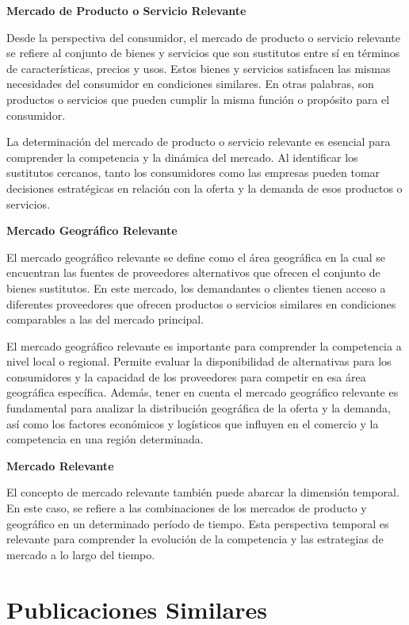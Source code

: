 \documentclass[
  doc,
  floatsintext,
  longtable,
  a4paper,
  nolmodern,
  notxfonts,
  notimes,
  12pt,
  colorlinks=true,linkcolor=blue,citecolor=blue,urlcolor=blue]{apa7}
\begin{document}
\textbf{Mercado de Producto o Servicio Relevante}

Desde la perspectiva del consumidor, el mercado de producto o servicio
relevante se refiere al conjunto de bienes y servicios que son
sustitutos entre sí en términos de características, precios y usos.
Estos bienes y servicios satisfacen las mismas necesidades del
consumidor en condiciones similares. En otras palabras, son productos o
servicios que pueden cumplir la misma función o propósito para el
consumidor.

La determinación del mercado de producto o servicio relevante es
esencial para comprender la competencia y la dinámica del mercado. Al
identificar los sustitutos cercanos, tanto los consumidores como las
empresas pueden tomar decisiones estratégicas en relación con la oferta
y la demanda de esos productos o servicios.

\textbf{Mercado Geográfico Relevante}

El mercado geográfico relevante se define como el área geográfica en la
cual se encuentran las fuentes de proveedores alternativos que ofrecen
el conjunto de bienes sustitutos. En este mercado, los demandantes o
clientes tienen acceso a diferentes proveedores que ofrecen productos o
servicios similares en condiciones comparables a las del mercado
principal.

El mercado geográfico relevante es importante para comprender la
competencia a nivel local o regional. Permite evaluar la disponibilidad
de alternativas para los consumidores y la capacidad de los proveedores
para competir en esa área geográfica específica. Además, tener en cuenta
el mercado geográfico relevante es fundamental para analizar la
distribución geográfica de la oferta y la demanda, así como los factores
económicos y logísticos que influyen en el comercio y la competencia en
una región determinada.

\textbf{Mercado Relevante}

El concepto de mercado relevante también puede abarcar la dimensión
temporal. En este caso, se refiere a las combinaciones de los mercados
de producto y geográfico en un determinado período de tiempo. Esta
perspectiva temporal es relevante para comprender la evolución de la
competencia y las estrategias de mercado a lo largo del tiempo.

\section{Publicaciones Similares}\label{publicaciones-similares}
\end{document}
